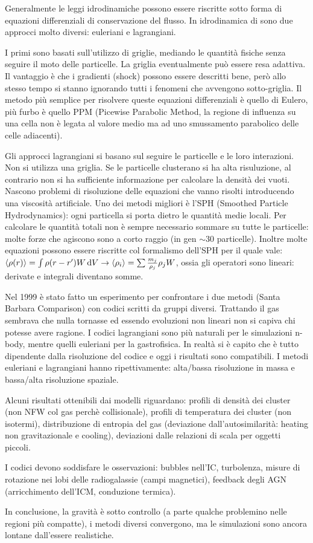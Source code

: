 Generalmente le leggi idrodinamiche possono essere riscritte sotto forma di equazioni differenziali di conservazione del flusso. In idrodinamica di sono due approcci molto diversi: euleriani e lagrangiani. 

I primi sono basati sull'utilizzo di griglie, mediando le quantità fisiche senza seguire il moto delle particelle. La griglia eventualmente può essere resa adattiva. Il vantaggio è che i gradienti (shock) possono essere descritti bene, però allo stesso tempo si stanno ignorando tutti i fenomeni che avvengono sotto-griglia. Il metodo più semplice per risolvere queste equazioni differenziali è quello di Eulero, più furbo è quello PPM (Picewise Parabolic Method, la regione di influenza su una cella non è legata al valore medio ma ad uno smussamento parabolico delle celle adiacenti). 

Gli approcci lagrangiani si basano sul seguire le particelle e le loro interazioni. Non si utilizza una griglia. Se le particelle clusterano si ha alta risuluzione, al contrario non si ha sufficiente informazione per calcolare la densità dei vuoti. Nascono problemi di risoluzione delle equazioni che vanno risolti introducendo una viscosità artificiale. Uno dei metodi migliori è l'SPH (Smoothed Particle Hydrodynamics): ogni particella si porta dietro le quantità medie locali. Per calcolare le quantità totali non è sempre necessario sommare su tutte le particelle: molte forze che agiscono sono a corto raggio (in gen $\sim 30$ particelle). Inoltre molte equazioni possono essere riscritte col formalismo dell'SPH per il quale vale: $\left\langle \rho (r)\right\rangle =\int\rho(r-r')W\operatorname{d}\!{V}\to \left\langle \rho_i\right\rangle= \sum \frac{m_j}{\rho_j}\rho_j W$, ossia gli operatori sono lineari: derivate e integrali diventano somme.  

Nel 1999 è stato fatto un esperimento per confrontare i due metodi (Santa Barbara Comparison) con codici scritti da gruppi diversi. Trattando il gas sembrava che nulla tornasse ed essendo evoluzioni non lineari non si capiva chi potesse avere ragione. I codici lagrangiani sono più naturali per le simulazioni n-body, mentre quelli euleriani per la gastrofisica. In realtà si è capito che è tutto dipendente dalla risoluzione del codice e oggi i risultati sono compatibili. I metodi euleriani e lagrangiani hanno ripettivamente: alta/bassa risoluzione in massa e bassa/alta risoluzione spaziale.

Alcuni risultati ottenibili dai modelli riguardano: profili di densità dei cluster (non NFW col gas perchè collisionale), profili di temperatura dei cluster (non isotermi), distribuzione di entropia del gas (deviazione dall'autosimilarità: heating non gravitazionale e cooling), deviazioni dalle relazioni di scala per oggetti piccoli. 

I codici devono soddisfare le osservazioni: bubbles nell'IC, turbolenza, misure di rotazione nei lobi delle radiogalassie (campi magnetici), feedback degli AGN (arricchimento dell'ICM, conduzione termica). 

In conclusione, la gravità è sotto controllo (a parte qualche problemino nelle regioni più compatte), i metodi diversi convergono, ma le simulazioni sono ancora lontane dall'essere realistiche. 

